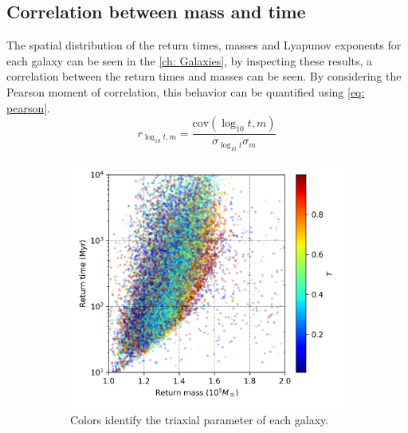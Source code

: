 	\subsection{Correlation between mass and time}
	The spatial distribution of the return times, masses and Lyapunov exponents for each galaxy can be seen in the \autoref{ch: Galaxies}, by inspecting these results, a correlation between the return times and masses can be seen. By considering the Pearson moment of correlation, this behavior can be quantified using \autoref{eq: pearson}.
	\begin{equation}\label{eq: pearson}
		r_{\log_{10}t, m} = \dfrac{\text{cov}(\log_{10}t, m)}{\sigma_{\log_{10}t}\sigma_m}
	\end{equation}
	
	\begin{figure}[h]
		\centering
		\begin{subfigure}[b]{0.49\textwidth}
			\includegraphics[width = \textwidth]{"../Files/Week 13/correlation_T"}
			\caption{Colors identify the triaxial parameter of each galaxy.}
			\label{fig: triaxial_correlation}
		\end{subfigure}
		~ 
		\begin{subfigure}[b]{0.49\textwidth}

\end{subfigure}
\end{figure}
